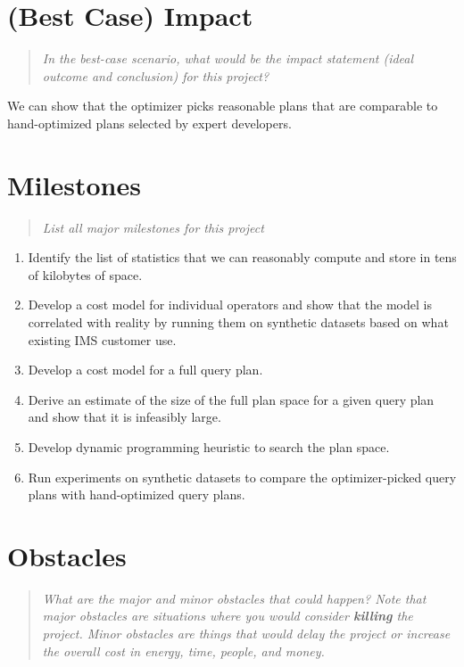 \documentclass{proc}
\begin{document}
\section{(Best Case) Impact}
\begin{quote}
\emph{In the best-case scenario, what would be the impact statement (ideal outcome and conclusion) for this project?} 
\end{quote}

We can show that the optimizer picks reasonable plans that are comparable to hand-optimized plans selected by expert developers.

\section{Milestones}
\begin{quote}
\emph{List all major milestones for this project}
\end{quote}

\begin{enumerate}
  \item Identify the list of statistics that we can reasonably compute and store in tens of kilobytes of space.
  \item Develop a cost model for individual operators and show that the model is correlated with reality by running them on synthetic datasets based on what existing IMS customer use.
  \item Develop a cost model for a full query plan.
  \item Derive an estimate of the size of the full plan space for a given query plan and show that it is infeasibly large.
  \item Develop dynamic programming heuristic to search the plan space.
  \item Run experiments on synthetic datasets to compare the optimizer-picked query plans with hand-optimized query plans.
\end{enumerate}

\section{Obstacles}
\begin{quote}
\emph{What are the major and minor obstacles that could happen? 
Note that major obstacles are situations where you would consider \textbf{killing} the project. 
Minor obstacles are things that would delay the project or increase the overall cost in energy, time, people, and money.}
\end{quote}
\end{document}

